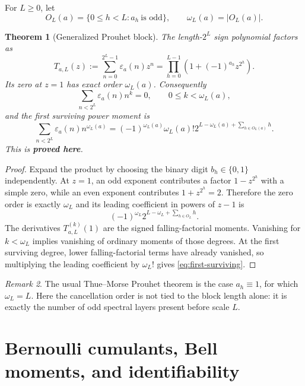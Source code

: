 \documentclass[11pt,oneside]{article}
\numberwithin{equation}{section}
\newtheorem{theorem}{Theorem}[section]
\theoremstyle{definition}
\theoremstyle{remark}
\newtheorem{remark}[theorem]{Remark}
\newcommand{\statusproved}{\textcolor{deepgreen}{\textbf{proved here}}}
\begin{document}
For $L\ge0$, let
\begin{equation}
 O_L(a)=\{0\le h<L:a_h\ \text{is odd}\},
 \qquad \omega_L(a)=|O_L(a)|.
 \label{eq:O-omega}
\end{equation}

\begin{theorem}[Generalized Prouhet block]
\label{thm:general-prouhet}
The length-$2^L$ sign polynomial factors as
\begin{equation}
 T_{a,L}(z):=\sum_{n=0}^{2^L-1}\varepsilon_a(n)z^n
 =\prod_{h=0}^{L-1}\left(1+(-1)^{a_h}z^{2^h}\right).
 \label{eq:T-a-L}
\end{equation}
Its zero at $z=1$ has exact order $\omega_L(a)$.  Consequently
\begin{equation}
 \sum_{n<2^L}\varepsilon_a(n)n^k=0,
 \qquad 0\le k<\omega_L(a),
 \label{eq:Prouhet-vanish}
\end{equation}
and the first surviving power moment is
\begin{equation}
 \boxed{\quad
 \sum_{n<2^L}\varepsilon_a(n)n^{\omega_L(a)}
 =(-1)^{\omega_L(a)}\omega_L(a)!
 2^{L-\omega_L(a)+\sum_{h\in O_L(a)}h}.
 \quad}
 \label{eq:first-surviving}
\end{equation}
This is \statusproved.
\end{theorem}

\begin{proof}
Expand the product by choosing the binary digit $b_h\in\{0,1\}$ independently.  At $z=1$,
an odd exponent contributes a factor $1-z^{2^h}$ with a simple zero, while an even exponent
contributes $1+z^{2^h}=2$.  Therefore the zero order is exactly $\omega_L$ and its leading
coefficient in powers of $z-1$ is
\[
 (-1)^{\omega_L}2^{L-\omega_L+\sum_{h\in O_L}h}.
\]
The derivatives $T_{a,L}^{(k)}(1)$ are the signed falling-factorial moments.  Vanishing for
$k<\omega_L$ implies vanishing of ordinary moments of those degrees.  At the first surviving
degree, lower falling-factorial terms have already vanished, so multiplying the leading
coefficient by $\omega_L!$ gives \eqref{eq:first-surviving}.
\end{proof}

\begin{remark}
The usual Thue--Morse Prouhet theorem is the case $a_h\equiv1$, for which
$\omega_L=L$.  Here the cancellation order is not tied to the block length alone: it is
exactly the number of odd spectral layers present before scale $L$.
\end{remark}

\section{Bernoulli cumulants, Bell moments, and identifiability}
\label{sec:cumulants}
\end{document}
